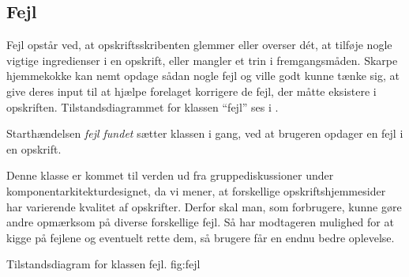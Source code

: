 \subsection{Fejl}
Fejl opstår ved, at opskriftsskribenten glemmer eller overser d\'{e}t, at tilføje nogle vigtige ingredienser i en opskrift, eller mangler et trin i fremgangsmåden. Skarpe hjemmekokke kan nemt opdage sådan nogle fejl og ville godt kunne tænke sig, at give deres input til at hjælpe forelaget korrigere de fejl, der måtte eksistere i opskriften. Tilstandsdiagrammet for klassen ``fejl'' ses i .

Starthændelsen \textit{fejl fundet} sætter klassen i gang, ved at brugeren opdager en fejl i en opskrift.

Denne klasse er kommet til verden ud fra gruppediskussioner under komponentarkitekturdesignet, da vi mener, at forskellige opskriftshjemmesider har varierende kvalitet af opskrifter. Derfor skal man, som forbrugere, kunne gøre andre opmærksom på diverse forskellige fejl. Så har modtageren mulighed for at kigge på fejlene og eventuelt rette dem, så brugere får en endnu bedre oplevelse.

  {Tilstandsdiagram for klassen fejl.}
  {fig:fejl}
